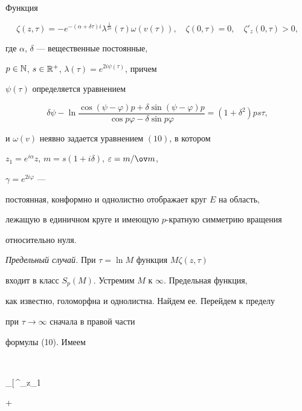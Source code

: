 \begin{thm} 


Функция 


$$ 


\zeta(z,\tau)=-e^{-(\alpha+\delta\tau)i}\lambda^{\frac{1}{2s}} 


(\tau)\omega(v(\tau)),\quad 


\zeta(0,\tau)=0,\quad \zeta'_z(0,\tau)>0, 


$$ 


где $\alpha$, $\delta$ --- вещественные постоянные, 


$p\in\Bbb N$, $s\in\Bbb R^+$, $\lambda(\tau)=e^{2i\psi(\tau)}$, причем 


$\psi(\tau)$ определяется уравнением 


$$ 


\delta\psi-\ln 


\frac{\cos(\psi-\varphi)p+\delta\sin(\psi-\varphi)p} 


{\cos p\varphi-\delta\sin p\varphi}= 


(1+\delta^2)ps\tau, 


$$ 


и $\omega(v)$ неявно задается уравнением $(10)$, в котором 


$z_1=e^{i\alpha}z$, $m=s(1+i\delta)$, $\varepsilon=m/\ov m$,


$\gamma=e^{2i\varphi}$ --- 


постоянная, конформно и однолистно отображает круг $E$ на область, 


лежащую в единичном круге и имеющую $p$-кратную симметрию вращения 


относительно нуля. 


\end{thm} 


 


{\it Предельный случай.} При $\tau=\ln M$ функция $M{}\zeta(z,\tau)$ 


входит в класс $S_p(M)$. Устремим $M$ к $\infty$. Предельная функция, 


как известно, голоморфна и однолистна. Найдем ее. Перейдем к пределу 


при $\tau\to\infty$ сначала в правой части 


формулы (10). Имеем 


$$ 


\lim_{\tau\to\infty}\bigg[\,\int^{\omega}_{z_1} 


+ 



